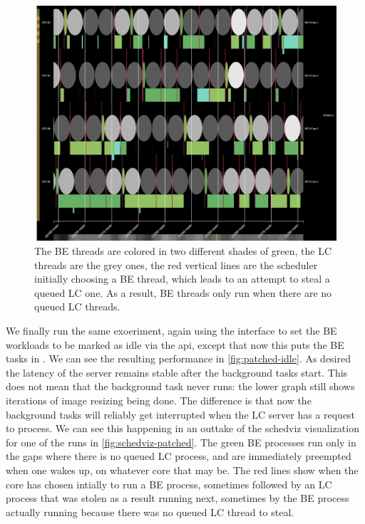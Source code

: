 \begin{figure}[t]
    \centering
    \includegraphics[width=\columnwidth]{graphs/schedviz-patched.png}
    \caption{The BE threads are colored in two different shades of green, the LC
    threads are the grey ones, the red vertical lines are the scheduler
    initially choosing a BE thread, which leads to an attempt to steal a queued
    LC one. As a result, BE threads only run when there are no queued LC
    threads.}\label{fig:schedviz-patched}
\end{figure}

We finally run the same exoeriment, again using the \cgroups{} interface to set
the BE workloads to be marked as idle via the \cgroups{} api, except that now
this puts the BE tasks in \schedbe{}. We can see the resulting performance in
\autoref{fig:patched-idle}. As desired the latency of the server remains stable
after the background tasks start. This does not mean that the background task
never runs: the lower graph still shows iterations of image resizing being done.
The difference is that now the background tasks will reliably get interrupted
when the LC server has a request to process. We can see this happening in an
outtake of the schedviz visualization for one of the runs in
\autoref{fig:schedviz-patched}. The green BE processes run only in the gaps
where there is no queued LC process, and are immediately preempted when one
wakes up, on whatever core that may be. The red lines show when the core has
chosen intially to run a BE process, sometimes followed by an LC process that
was stolen as a result running next, sometimes by the BE process actually
running because there was no queued LC thread to steal.


